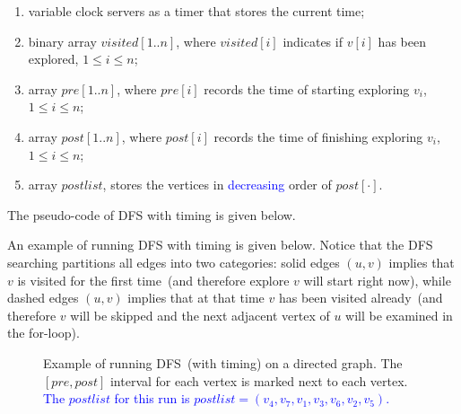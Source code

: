 \vspace*{-\topsep}
\begin{enumerate}
\item variable clock servers as a timer that stores the current time;
\item binary array $visited[1..n]$, where $visited[i]$ indicates if $v[i]$ has been explored, $1 \le i \le n$;
\item array $pre[1..n]$, where $pre[i]$ records the time of starting exploring $v_i$, $1 \le i \le n$;
\item array $post[1..n]$, where $post[i]$ records the time of finishing exploring $v_i$, $1 \le i \le n$;
\item array $postlist$, stores the vertices in \textcolor{blue}{decreasing} order of $post[\cdot]$.
\end{enumerate}

The pseudo-code of DFS with timing is given below.

\begin{minipage}{0.8\textwidth}
	\xxx
	\xxx
	\xxx
	\xxx
	\xxx
	\xxx
\end{minipage}

\begin{minipage}{0.8\textwidth}
	\xxx
	\xxx
	\xxx
	\xxx
	\xxx
	\xxx
	\xxx
	\xxx
	\xxx
	\xxx
	\xxx
\end{minipage}

An example of running DFS with timing is given below.
Notice that the DFS searching partitions all edges into two categories:
solid edges $(u,v)$ implies that $v$ is visited for the first time~(and therefore explore $v$ will start right now),
while dashed edges $(u,v)$ implies that at that time $v$ has been visited already~(and therefore $v$ will be skipped and the next adjacent
vertex of $u$ will be examined in the for-loop). 

\begin{figure}[h!]
\centering{}
\caption{Example of running DFS~(with timing) on a directed graph. 
The $[pre,post]$ interval for each vertex
is marked next to each vertex. 
\textcolor{blue}{The $postlist$ for this run is $postlist = (v_4,v_7,v_1,v_3,v_6,v_2,v_5)$.}}
\end{figure}

